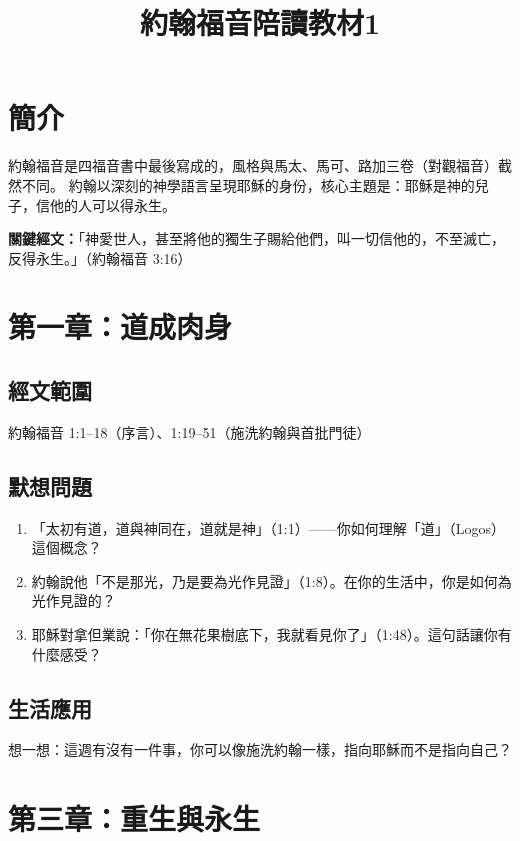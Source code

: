 \documentclass[12pt, a4paper]{article}
\title{約翰福音陪讀教材1}
\author{}
\date{}
\begin{document}
\maketitle

\section*{簡介}

約翰福音是四福音書中最後寫成的，風格與馬太、馬可、路加三卷（對觀福音）截然不同。
約翰以深刻的神學語言呈現耶穌的身份，核心主題是：耶穌是神的兒子，信他的人可以得永生。

\bigskip
\noindent\textbf{關鍵經文：}「神愛世人，甚至將他的獨生子賜給他們，叫一切信他的，不至滅亡，反得永生。」（約翰福音 3:16）

\section{第一章：道成肉身}

\subsection*{經文範圍}
約翰福音 1:1--18（序言）、1:19--51（施洗約翰與首批門徒）

\subsection*{默想問題}
\begin{enumerate}[leftmargin=*, label=\arabic*.]
  \item 「太初有道，道與神同在，道就是神」（1:1）——你如何理解「道」（Logos）這個概念？
  \item 約翰說他「不是那光，乃是要為光作見證」（1:8）。在你的生活中，你是如何為光作見證的？
  \item 耶穌對拿但業說：「你在無花果樹底下，我就看見你了」（1:48）。這句話讓你有什麼感受？
\end{enumerate}

\subsection*{生活應用}
想一想：這週有沒有一件事，你可以像施洗約翰一樣，指向耶穌而不是指向自己？

\section{第三章：重生與永生}
\end{document}
